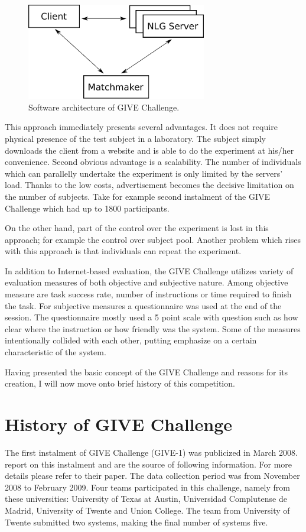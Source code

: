 \begin{figure}[!htbp]
  \centering
	\includegraphics[width=0.7\textwidth]{Images/give-client-servers}
	\caption{Software architecture of GIVE Challenge.}
	\label{fig:give-clientserver}
\end{figure}

This approach immediately presents several advantages. It does not require physical presence of the test subject in a laboratory. The subject simply downloads the client from a website and is able to do the experiment at his/her convenience. Second obvious advantage is a scalability. The number of individuals which can parallelly undertake the experiment is only limited by the servers' load. Thanks to the low costs, advertisement becomes the decisive limitation on the number of subjects. Take for example second instalment of the GIVE Challenge which had up to 1800 participants.

On the other hand, part of the control over the experiment is lost in this approach; for example the control over subject pool. Another problem which rises with this approach is that individuals can repeat the experiment.

In addition to Internet-based evaluation, the GIVE Challenge utilizes variety of evaluation measures of both objective and subjective nature. Among objective measure are task success rate, number of instructions or time required to finish the task. For subjective measures a questionnaire was used at the end of the session. The questionnaire mostly used a 5 point scale with question such as how clear where the instruction or how friendly was the system. Some of the measures intentionally collided with each other, putting emphasize on a certain characteristic of the system.

Having presented the basic concept of the GIVE Challenge and reasons for its creation, I will now move onto brief history of this competition. 

 
\section{History of GIVE Challenge}
The first instalment of GIVE Challenge (GIVE-1) was publicized in March 2008. \citet{koller2010first} report on this instalment and are the source of following information. For more details please refer to their paper. The data collection period was from November 2008 to February 2009. Four teams participated in this challenge, namely from these universities: University of Texas at Austin, Universidad Complutense de Madrid, University of Twente and Union College. The team from University of Twente submitted two systems, making the final number of systems five.

